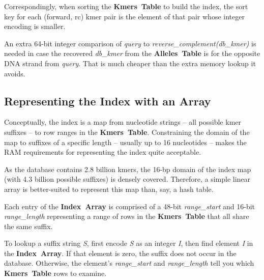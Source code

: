\documentclass[10pt]{article}
\newcommand\figurebreak{}
\newcommand\datastructure[1]{\hbox{\textbf{#1}}}
\newcommand\AllelesTable{\datastructure{Alleles Table}}
\newcommand\KmersTable{\datastructure{Kmers Table}}
\newcommand\IndexArray{\datastructure{Index Array}}
\newcommand\var[1]{\hbox{\textsl{#1}}}
\begin{document}
Correspondingly, when sorting the \KmersTable{} to build the index, the sort key for each (forward, rc) kmer pair is the element of that pair whose integer encoding is smaller.

An extra 64-bit integer comparison of \var{query} to \var{reverse_complement(db_kmer)} is needed in case the recovered \var{db_kmer} from the \AllelesTable{} is for the opposite DNA strand from \var{query}.  That is much cheaper than the extra memory lookup it avoids.  

\pagebreak

\subsection{Representing the Index with an Array}

Conceptually, the index is a map from nucleotide strings -- all possible kmer suffixes -- to row ranges in the \KmersTable{}.  Constraining the domain of the map to suffixes of a specific length -- usually up to 16 nucleotides -- makes the RAM requirements for representing the index quite acceptable.

As the database contains 2.8 billion kmers, the 16-bp domain of the index map (with 4.3 billion possible suffixes) is densely covered.  Therefore, a simple linear array is better-suited to represent this map than, say, a hash table.

Each entry of the \IndexArray{} is comprised of a 48-bit \var{range_start} and 16-bit \var{range_length} representing a range of rows in the \KmersTable{} that all share the same suffix.

To lookup a suffix string \var{S}, first encode \var{S} as an integer \var{I}, then find element \var{I} in the \IndexArray{}.  If that element is zero, the suffix does not occur in the database. Otherwise, the element's \var{range_start} and \var{range_length} tell you which \KmersTable{} rows to examine.

\figurebreak
\end{document}
